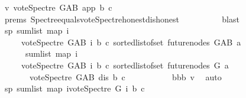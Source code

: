 \begin{isabellebody}
\ v{}{\isacharcolon}{\kern0pt}\ {\isachardoublequoteopen}vote{\isacharunderscore}{\kern0pt}Spectre\ G{\isacharunderscore}{\kern0pt}AB\ app\ b\ c\ {\isacharequal}{\kern0pt}\ {}{\isachardoublequoteclose}\isanewline
\ \ \ \ \ \ \ \ \isamarkupfalse%
\ {\isachardoublequoteopen}{}{\isachardot}{\kern0pt}prems{\isachardoublequoteclose}\ Spectre{\isacharunderscore}{\kern0pt}equals{\isacharunderscore}{\kern0pt}vote{\isacharunderscore}{\kern0pt}Spectre{\isacharunderscore}{\kern0pt}honest{\isacharunderscore}{\kern0pt}dishonest\isanewline
\ \ \ \ \ \ \ \ \isamarkupfalse%
\ blast\ \isanewline
\ \ \ \ \ \ \isamarkupfalse%
\ sp{}{\isacharcolon}{\kern0pt}\ {\isachardoublequoteopen}sum{\isacharunderscore}{\kern0pt}list\ {\isacharparenleft}{\kern0pt}map\ {\isacharparenleft}{\kern0pt}{\isasymlambda}i{\isachardot}{\kern0pt}\isanewline
\ \ \ \ \ {\isacharparenleft}{\kern0pt}vote{\isacharunderscore}{\kern0pt}Spectre\ G{\isacharunderscore}{\kern0pt}AB\ i\ b\ c{\isacharparenright}{\kern0pt}{\isacharparenright}{\kern0pt}\ {\isacharparenleft}{\kern0pt}sorted{\isacharunderscore}{\kern0pt}list{\isacharunderscore}{\kern0pt}of{\isacharunderscore}{\kern0pt}set\ {\isacharparenleft}{\kern0pt}future{\isacharunderscore}{\kern0pt}nodes\ G{\isacharunderscore}{\kern0pt}AB\ a{\isacharparenright}{\kern0pt}{\isacharparenright}{\kern0pt}{\isacharparenright}{\kern0pt}\ {\isacharequal}{\kern0pt}\ \isanewline
\ \ \ \ \ \ sum{\isacharunderscore}{\kern0pt}list\ {\isacharparenleft}{\kern0pt}map\ {\isacharparenleft}{\kern0pt}{\isasymlambda}i{\isachardot}{\kern0pt}\isanewline
\ \ \ \ \ {\isacharparenleft}{\kern0pt}vote{\isacharunderscore}{\kern0pt}Spectre\ G{\isacharunderscore}{\kern0pt}AB\ i\ b\ c{\isacharparenright}{\kern0pt}{\isacharparenright}{\kern0pt}\ {\isacharparenleft}{\kern0pt}sorted{\isacharunderscore}{\kern0pt}list{\isacharunderscore}{\kern0pt}of{\isacharunderscore}{\kern0pt}set\ {\isacharparenleft}{\kern0pt}future{\isacharunderscore}{\kern0pt}nodes\ G\ a{\isacharparenright}{\kern0pt}{\isacharparenright}{\kern0pt}{\isacharparenright}{\kern0pt}\ {\isacharplus}{\kern0pt}\ {}\ \isanewline
\ \ \ \ \ \ {\isacharplus}{\kern0pt}\ {\isacharparenleft}{\kern0pt}vote{\isacharunderscore}{\kern0pt}Spectre\ G{\isacharunderscore}{\kern0pt}AB\ dis\ b\ c{\isacharparenright}{\kern0pt}{\isachardoublequoteclose}\ \isanewline
\ \ \ \ \ \ \ \ \isamarkupfalse%
\ bbb\ v{}\ \isamarkupfalse%
\ auto\isanewline
\ \ \ \ \ \ \isamarkupfalse%
\ sp{}{\isacharcolon}{\kern0pt}\ {\isachardoublequoteopen}sum{\isacharunderscore}{\kern0pt}list\ {\isacharparenleft}{\kern0pt}map\ {\isacharparenleft}{\kern0pt}{\isasymlambda}i{\isachardot}{\kern0pt}{\isacharparenleft}{\kern0pt}vote{\isacharunderscore}{\kern0pt}Spectre\ G\ i\ b\ c{\isacharparenright}{\kern0pt}{\isacharparenright}{\kern0pt}\isanewline

\end{isabellebody}
